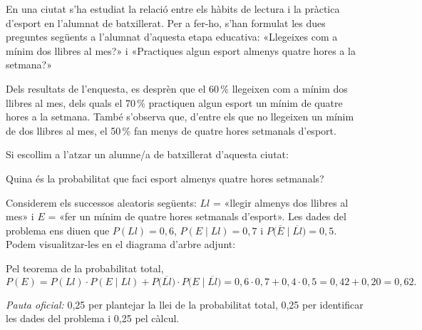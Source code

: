 En una ciutat s'ha estudiat la relació entre els hàbits de lectura i la pràctica d'esport en l'alumnat de
batxillerat. Per a fer-ho, s'han formulat les dues preguntes següents a l'alumnat d'aquesta etapa
educativa: «Llegeixes com a mínim dos llibres al mes?» i «Practiques algun esport almenys quatre hores a
la setmana?»

Dels resultats de l'enquesta, es desprèn que el 60\,\% llegeixen com a mínim dos llibres al mes, dels quals
el 70\,\% practiquen algun esport un mínim de quatre hores a la setmana. També s'observa que, d'entre els que
no llegeixen un mínim de dos llibres al mes, el 50\,\% fan menys de quatre hores setmanals d'esport.

Si escollim a l'atzar un alumne/a de batxillerat d'aquesta ciutat:

\begin{apartats}

Quina és la probabilitat que faci esport almenys quatre hores setmanals?

\begin{solucio}
Considerem els successos aleatoris següents: $Ll$ = «llegir almenys dos llibres al mes» i $E$ = «fer un
mínim de quatre hores setmanals d'esport». Les dades del problema ens diuen que $P(Ll)=0{,}6$,
$P(E\mid Ll)=0{,}7$ i $P\bigl(\overline{E}\mid\overline{Ll}\bigr)=0{,}5$. Podem visualitzar-les en el diagrama
d'arbre adjunt:
\begin{center}
\end{center}
Pel teorema de la probabilitat total,
\[
P(E)=P(Ll)\cdot P(E\mid Ll)+P\bigl(\overline{Ll}\bigr)\cdot P\bigl(E\mid\overline{Ll}\bigr)
=0{,}6\cdot0{,}7+0{,}4\cdot0{,}5=0{,}42+0{,}20=0{,}62 .
\]

\textit{Pauta oficial:} 0,25 per plantejar la llei de la probabilitat total, 0,25 per identificar les dades
del problema i 0,25 pel càlcul.
\end{solucio}


\end{apartats}
